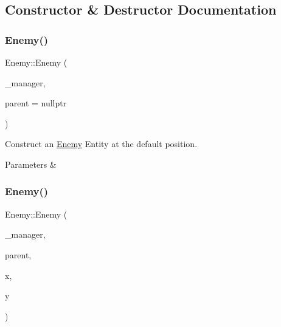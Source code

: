 \subsection{Constructor \& Destructor Documentation}
\mbox{\label{class_enemy_afbeea953604d996ac52253ae7c73cd21}} 
\subsubsection{\texorpdfstring{Enemy()}{Enemy()}\hspace{0.1cm}{\footnotesize\ttfamily [1/3]}}
{\footnotesize\ttfamily Enemy\+::\+Enemy (\begin{DoxyParamCaption}\item[{\mbox{\hyperlink{class_game_manager}{Game\+Manager}} $\ast$}]{\+\_\+manager,  }\item[{\mbox{\hyperlink{class_game_entity}{Game\+Entity}} $\ast$}]{parent = {\ttfamily nullptr} }\end{DoxyParamCaption})}



Construct an \mbox{\hyperlink{class_enemy}{Enemy}} Entity at the default position. 


\begin{DoxyParams}{Parameters}
{\em } & \\
\hline
\end{DoxyParams}
\mbox{\label{class_enemy_a0357c3d13cf104705fd0cbdf47a71673}} 
\subsubsection{\texorpdfstring{Enemy()}{Enemy()}\hspace{0.1cm}{\footnotesize\ttfamily [2/3]}}
{\footnotesize\ttfamily Enemy\+::\+Enemy (\begin{DoxyParamCaption}\item[{\mbox{\hyperlink{class_game_manager}{Game\+Manager}} $\ast$}]{\+\_\+manager,  }\item[{\mbox{\hyperlink{class_game_entity}{Game\+Entity}} $\ast$}]{parent,  }\item[{float}]{x,  }\item[{float}]{y }\end{DoxyParamCaption})}



